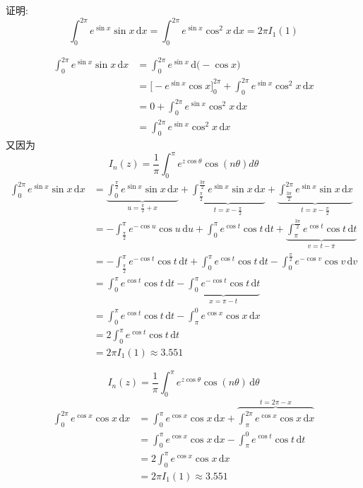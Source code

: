 \documentclass[color=green,titlestyle=hang]{elegantbook}%
\begin{document}
\begin{exercise}证明:~\begin{equation*}\int_{0}^{2\pi}e^{\sin x}\sin x\,\mathrm{d}x=\int_{0}^{2\pi}e^{\sin x}\cos^2 x\,\mathrm{d}x=2\pi I_1(1)\end{equation*}
\end{exercise}\begin{Solution}\begin{align*}\int_{0}^{2\pi}e^{\sin x}\sin x\,\mathrm{d}x&=\int_{0}^{2\pi}e^{\sin x}\,\mathrm{d}\big(-\cos x\big)\\
&=\Big[-e^{\sin x}\cos x\Big]_{0}^{2\pi}+\int_{0}^{2\pi}e^{\sin x}\cos^2 x\,\mathrm{d}x\\
&=0+\int_{0}^{2\pi}e^{\sin x}\cos^2 x\,\mathrm{d}x\\
&=\int_{0}^{2\pi}e^{\sin x}\cos^2 x\,\mathrm{d}x
\end{align*}
又因为\begin{equation*}I_n\left(z\right)=\frac{1}{\pi}\int_0^\pi e^{z\cos\theta}\cos\left(n\theta\right)d\theta\end{equation*}
\begin{align*}\int_{0}^{2\pi}e^{\sin x}\sin x\,\mathrm{d}x&=\underbrace{\int_{0}^{\frac{\pi}{2}}e^{\sin x}\sin x\,\mathrm{d}x}\limits_{u=\frac{\pi}{2}+x}+\underbrace{\int_{\frac{\pi}{2}}^{\frac{3\pi}{2}}e^{\sin x}\sin x\,\mathrm{d}x}\limits_{t=x-\frac{\pi}{2}}+\underbrace{\int_{\frac{3\pi}{2}}^{2\pi}e^{\sin x}\sin x\,\mathrm{d}x}\limits_{t=x-\frac{\pi}{2}}\\
&=-\int_{\frac{\pi}{2}}^{\pi}e^{-\cos u}\cos u\,\mathrm{d}u+\int_{0}^{\pi}e^{\cos t}\cos t\,\mathrm{d}t+\underbrace{\int_{\pi}^{\frac{3\pi}{2}}e^{\cos t}\cos t\,\mathrm{d}t}\limits_{v=t-\pi}\\
&=-\int_{\frac{\pi}{2}}^{\pi}e^{-\cos t}\cos t\,\mathrm{d}t+\int_{0}^{\pi}e^{\cos t}\cos t\,\mathrm{d}t-\int_{0}^{\frac{\pi}{2}}e^{-\cos v}\cos v\,\mathrm{d}v\\
&=\int_{0}^{\pi}e^{\cos t}\cos t\,\mathrm{d}t-\underbrace{\int_{0}^{\pi}e^{-\cos t}\cos t\,\mathrm{d}t}\limits_{x=\pi-t}\\
&=\int_{0}^{\pi}e^{\cos t}\cos t\,\mathrm{d}t-\int_{\pi}^{0}e^{\cos x}\cos x\,\mathrm{d}x\\
&=2\int_{0}^{\pi}e^{\cos t}\cos t\,\mathrm{d}t\\
&=2\pi I_1\left(1\right)\approx3.551
\end{align*}	
\end{Solution}

\begin{equation*}
I_n\left(z\right)=\frac{1}{\pi}\int_0^\pi e^{z\cos\theta}\cos\left(n\theta\right)\,\mathrm{d}\theta
\end{equation*}
\begin{align*}\int_{0}^{2\pi}e^{\cos x}\cos x\,\mathrm{d}x&=\int_{0}^{\pi}e^{\cos x}\cos x\,\mathrm{d}x+\overbrace{\int_{\pi}^{2\pi}e^{\cos x}\cos x\,\mathrm{d}x}^{t=2\pi-x}\\
&=\int_{0}^{\pi}e^{\cos x}\cos x\,\mathrm{d}x-\int_{\pi}^{0}e^{\cos t}\cos t\,\mathrm{d}t\\
&=2\int_{0}^{\pi}e^{\cos x}\cos x\,\mathrm{d}x\\
&=2\pi I_1(1)\approx3.551
\end{align*}
\end{document}
